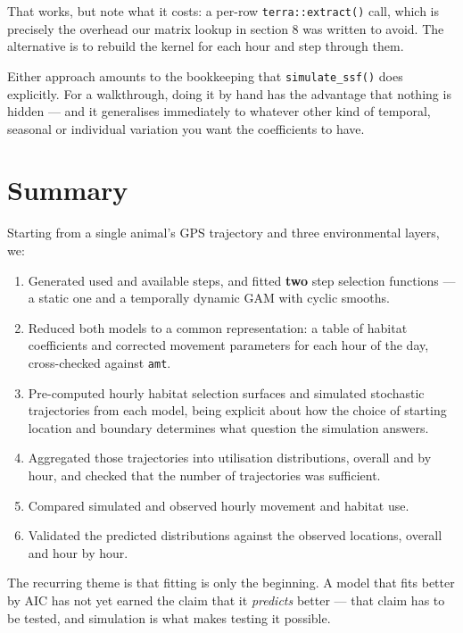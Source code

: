 \documentclass[
  letterpaper,
  DIV=11,
  numbers=noendperiod]{scrartcl}
\providecommand{\tightlist}{%
  \setlength{\itemsep}{0pt}\setlength{\parskip}{0pt}}
\begin{document}
That works, but note what it costs: a per-row \texttt{terra::extract()}
call, which is precisely the overhead our matrix lookup in section 8 was
written to avoid. The alternative is to rebuild the kernel for each hour
and step through them.

Either approach amounts to the bookkeeping that \texttt{simulate\_ssf()}
does explicitly. For a walkthrough, doing it by hand has the advantage
that nothing is hidden --- and it generalises immediately to whatever
other kind of temporal, seasonal or individual variation you want the
coefficients to have.

\section{Summary}\label{summary}

Starting from a single animal's GPS trajectory and three environmental
layers, we:

\begin{enumerate}
\def\labelenumi{\arabic{enumi}.}
\tightlist
\item
  Generated used and available steps, and fitted \textbf{two} step
  selection functions --- a static one and a temporally dynamic GAM with
  cyclic smooths.
\item
  Reduced both models to a common representation: a table of habitat
  coefficients and corrected movement parameters for each hour of the
  day, cross-checked against \texttt{amt}.
\item
  Pre-computed hourly habitat selection surfaces and simulated
  stochastic trajectories from each model, being explicit about how the
  choice of starting location and boundary determines what question the
  simulation answers.
\item
  Aggregated those trajectories into utilisation distributions, overall
  and by hour, and checked that the number of trajectories was
  sufficient.
\item
  Compared simulated and observed hourly movement and habitat use.
\item
  Validated the predicted distributions against the observed locations,
  overall and hour by hour.
\end{enumerate}

The recurring theme is that fitting is only the beginning. A model that
fits better by AIC has not yet earned the claim that it \emph{predicts}
better --- that claim has to be tested, and simulation is what makes
testing it possible.
\end{document}
